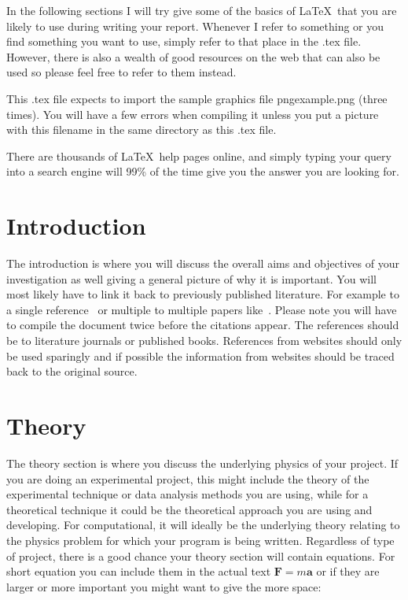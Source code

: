 \documentclass[a4paper,twocolumn,12pt, notitlepage]{article}
\begin{document}
In the following sections I will try give some of the basics of \LaTeX\ that you are likely to use during writing your report. Whenever I refer to something or you find something you want to use, simply refer to that place in the .tex file. However, there is also a wealth of good resources on the web that can also be used so please feel free to refer to them instead.

This .tex file expects to import the sample graphics file pngexample.png (three times). You will have a few errors when compiling it unless you put a picture with this filename in the same directory as this .tex file. 

There are thousands of \LaTeX\ help pages online, and simply typing your query into a search engine will 99\% of the time give you the answer you are looking for. 

\section{Introduction}
The introduction is where you will discuss the overall aims and objectives of your investigation as well giving a general picture of why it is important. You will most likely have to link it back to previously published literature. For example to a single reference~\cite{Paper_1} or multiple to multiple papers like~\cite{Paper_1, Paper_2, Paper_3}. Please note you will have to compile the document twice before the citations appear. The references should be to literature journals or published books. References from websites should only be used sparingly and if possible the information from websites should be traced back to the original source.


\section{Theory}
The theory section is where you discuss the underlying physics of your project. If you are doing an experimental project, this might include the theory of the experimental technique or data analysis methods you are using, while for a theoretical technique it could be the theoretical approach you are using and developing. For computational, it will ideally be the underlying theory relating to the physics problem for which your program is being written. Regardless of type of project, there is a good chance your theory section will contain equations. For short equation you can include them in the actual text $\mathbf{F} = m\mathbf{a}$ or if they are larger or more important you might want to give the more space:
\end{document}

